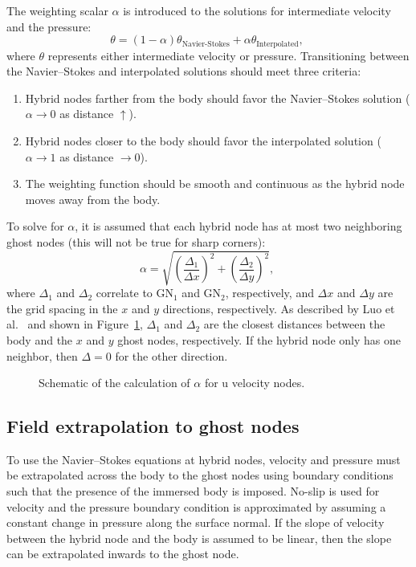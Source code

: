 The weighting scalar $\alpha$ is introduced to the solutions for intermediate velocity and the pressure:
\begin{equation}\label{eq:Weight}
\theta = \left(1-\alpha \right)\theta_{\text{Navier-Stokes}} + \alpha \theta_{\text{Interpolated}}, \;
\end{equation}
where $\theta$ represents either intermediate velocity or pressure.
Transitioning between the Navier--Stokes and interpolated solutions should meet three criteria:
\begin{enumerate}
	\item Hybrid nodes farther from the body should favor the Navier--Stokes solution ($\alpha \rightarrow 0$ as distance $\uparrow$).
	\item Hybrid nodes closer to the body should favor the interpolated solution ($\alpha \rightarrow 1$ as distance $ \rightarrow 0$).
	\item The weighting function should be smooth and continuous as the hybrid node moves away from the body.
\end{enumerate}
To solve for $\alpha$, it is assumed that each hybrid node has at most two neighboring ghost nodes (this will not be true for sharp corners):
\begin{equation}
\alpha = \sqrt{\left(\frac{\Delta_1}{\Delta x}\right)^2 + \left(\frac{\Delta_2}{\Delta y}\right)^2}, \;
\label{eq:Alpha}
\end{equation}
where $\Delta_1$ and $\Delta_2$ correlate to GN$_1$ and GN$_2$, respectively, and $\Delta x$ and $\Delta y$ are the grid spacing in the $x$ and $y$ directions, respectively. 
As described by Luo et al.~\cite{Luo:2012gx} and shown in Figure~\ref{fig:Weight}, $\Delta_1$ and $\Delta_2$ are the closest distances between the body and the $x$ and $y$ ghost nodes, respectively. 
If the hybrid node only has one neighbor, then $\Delta=0$ for the other direction. 
\begin{figure}[!htb]
	\centering
	
	\caption{Schematic of the calculation of $\alpha$ for u velocity nodes.}
	\label{fig:Weight}
\end{figure}

\subsection{Field extrapolation to ghost nodes}
\label{Sec:Field Extrapolation}

To use the Navier--Stokes equations at hybrid nodes, velocity and pressure must be extrapolated across the body to the ghost nodes using boundary conditions such that the presence of the immersed body is imposed.
No-slip is used for velocity and the pressure boundary condition is approximated by assuming a constant change in pressure along the surface normal.
If the slope of velocity between the hybrid node and the body is assumed to be linear, then the slope can be extrapolated inwards to the ghost node. 

